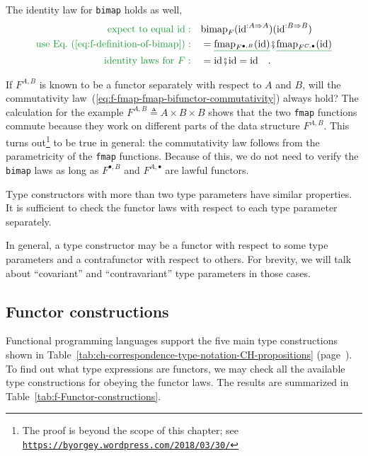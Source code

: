 The identity law for \lstinline!bimap! holds as well,
\begin{align*}
{\color{greenunder}\text{expect to equal }\text{id}:}\quad & \text{bimap}_{F}(\text{id}^{:A\Rightarrow A})(\text{id}^{:B\Rightarrow B})\\
{\color{greenunder}\text{use Eq.~(\ref{eq:f-definition-of-bimap})}:}\quad & =\gunderline{\text{fmap}_{F^{\bullet,B}}(\text{id})}\bef\gunderline{\text{fmap}_{F^{C,\bullet}}(\text{id})}\\
{\color{greenunder}\text{identity laws for }F:}\quad & =\text{id}\bef\text{id}=\text{id}\quad.
\end{align*}

If $F^{A,B}$ is known to be a functor separately with respect to
$A$ and $B$, will the commutativity law~(\ref{eq:f-fmap-fmap-bifunctor-commutativity})
always hold? The calculation for the example $F^{A,B}\triangleq A\times B\times B$
shows that the two \lstinline!fmap! functions commute because they
work on different parts of the data structure $F^{A,B}$. This turns
out\footnote{The proof is beyond the scope of this chapter; see \texttt{\href{https://byorgey.wordpress.com/2018/03/30/}{https://byorgey.wordpress.com/2018/03/30/}}}
to be true in general: the commutativity law follows from the parametricity
of the \lstinline!fmap! functions. Because of this, we do not need
to verify the \lstinline!bimap! laws as long as $F^{\bullet,B}$
and $F^{A,\bullet}$ are lawful functors.

Type constructors with more than two type parameters have similar
properties. It is sufficient to check the functor laws with respect
to each type parameter separately.

In general, a type constructor may be a functor with respect to some
type parameters and a contrafunctor with respect to others. For brevity,
we will talk about ``covariant'' and ``contravariant'' type parameters
in those cases.

\subsection{Functor constructions\label{subsec:f-Functor-constructions}}

Functional programming languages support the five main type constructions
shown in Table~\ref{tab:ch-correspondence-type-notation-CH-propositions}
(page~\pageref{tab:ch-correspondence-type-notation-CH-propositions}).
To find out what type expressions are functors, we may check all the
available type constructions for obeying the functor laws. The results
are summarized in Table~\ref{tab:f-Functor-constructions}. 

